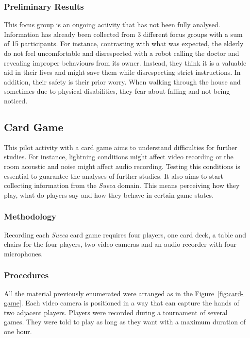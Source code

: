 \subsubsection{Preliminary Results}

This focus group is an ongoing activity that has not been fully analysed.
Information has already been collected from 3 different focus groups with a sum of 15 participants.
For instance, contrasting with what was expected, the elderly do not feel uncomfortable and disrespected with a robot calling the doctor and revealing improper behaviours from its owner.
Instead, they think it is a valuable aid in their lives and might save them while disrespecting strict instructions.
In addition, their safety is their prior worry.
When walking through the house and sometimes due to physical disabilities, they fear about falling and not being noticed.







\subsection{Card Game}
This pilot activity with a card game aims to understand difficulties for further studies.
For instance, lightning conditions might affect video recording or the room acoustic and noise might affect audio recording.
Testing this conditions is essential to guarantee the analyses of further studies.
It also aims to start collecting information from the \emph{Sueca} domain.
This means perceiving how they play, what do players say and how they behave in certain game states.

\subsubsection{Methodology}
Recording each \emph{Sueca} card game requires four players, one card deck, a table and chairs for the four players, two video cameras and an audio recorder with four microphones.

\subsubsection{Procedures}
All the material previously enumerated were arranged as in the Figure~\ref{fig:card-game}.
Each video camera is positioned in a way that can capture the hands of two adjacent players.
Players were recorded during a tournament of several games.
They were told to play as long as they want with a maximum duration of one hour.

